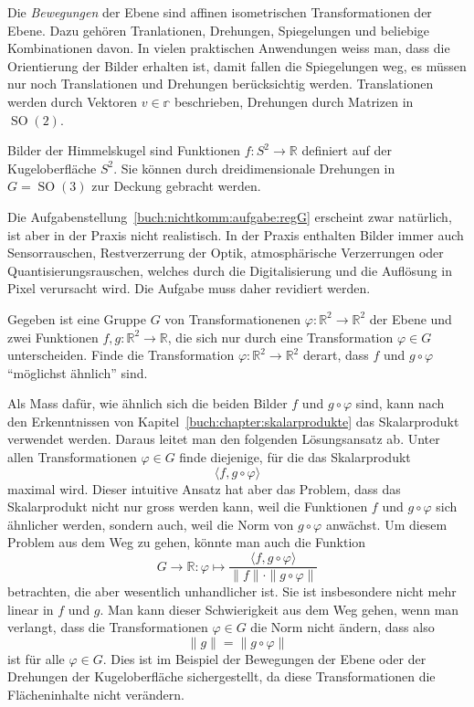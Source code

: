 \begin{beispiel}
Die {\em Bewegungen} der Ebene sind affinen isometrischen
Transformationen der Ebene.
Dazu gehören Tranlationen, Drehungen, Spiegelungen und beliebige
Kombinationen davon.
In vielen praktischen Anwendungen weiss man, dass die Orientierung
der Bilder erhalten ist, damit fallen die Spiegelungen weg, es
müssen nur noch Translationen und Drehungen berücksichtig werden.
Translationen werden durch Vektoren $v\in\mathbb{r}$ beschrieben,
Drehungen durch Matrizen in $\operatorname{SO}(2)$.
\end{beispiel}

\begin{beispiel}
Bilder der Himmelskugel sind Funktionen $f\colon S^2\to\mathbb{R}$
definiert auf der Kugeloberfläche $S^2$.
Sie können durch dreidimensionale Drehungen
in $G=\operatorname{SO}(3)$ zur Deckung gebracht werden.
\end{beispiel}

Die Aufgabenstellung~\ref{buch:nichtkomm:aufgabe:regG}
erscheint zwar natürlich, ist aber in der Praxis
nicht realistisch.
In der Praxis enthalten Bilder immer auch Sensorrauschen, Restverzerrung
der Optik, atmosphärische Verzerrungen oder Quantisierungsrauschen, welches
durch die Digitalisierung und die Auflösung in Pixel verursacht wird.
Die Aufgabe muss daher revidiert werden.

\begin{aufgabe}
\label{buch:nichtkomm:motivation:aufgabe:regGaehnlich}
Gegeben ist eine Gruppe $G$ von Transformationenen
$\varphi:\mathbb{R}^2 \to\mathbb{R}^2$ der Ebene und 
zwei Funktionen $f,g\colon\mathbb{R}^2\to\mathbb{R}$, die sich nur durch
eine Transformation $\varphi\in G$ unterscheiden.
Finde die Transformation $\varphi\colon\mathbb{R}^2\to\mathbb{R}^2$ derart,
dass $f$ und $g\circ \varphi$ ``möglichst ähnlich'' sind.
\end{aufgabe}

Als Mass dafür, wie ähnlich sich die beiden Bilder $f$ und
$g\circ\varphi$ sind, kann nach den Erkenntnissen von
Kapitel~\ref{buch:chapter:skalarprodukte} das Skalarprodukt
verwendet werden.
Daraus leitet man den folgenden Lösungsansatz ab.
Unter allen Transformationen $\varphi\in G$ finde diejenige,
für die das Skalarprodukt
\[
\langle f,g\circ \varphi\rangle
\]
maximal wird.
Dieser intuitive Ansatz hat aber das Problem, dass 
das Skalarprodukt nicht nur gross werden kann, weil die Funktionen
$f$ und $g\circ\varphi$ sich ähnlicher werden, sondern auch,
weil die Norm von $g\circ\varphi$ anwächst.
Um diesem Problem aus dem Weg zu gehen, könnte man auch 
die Funktion
\[
G\to\mathbb{R}
\colon
\varphi\mapsto
\frac{\langle f,g\circ \varphi\rangle}{\|f\|\cdot\|g\circ\varphi\|}
\]
betrachten, die aber wesentlich unhandlicher ist.
Sie ist insbesondere nicht mehr linear in $f$ und $g$.
Man kann dieser Schwierigkeit aus dem Weg gehen, wenn man
verlangt, dass die Transformationen $\varphi\in G$ die Norm nicht
ändern, dass also
\[
\|g\|
=
\|g\circ \varphi\|
\]
ist für alle $\varphi\in G$.
Dies ist im Beispiel der Bewegungen der Ebene oder der Drehungen
der Kugeloberfläche sichergestellt, da diese Transformationen
die Flächeninhalte nicht verändern.

